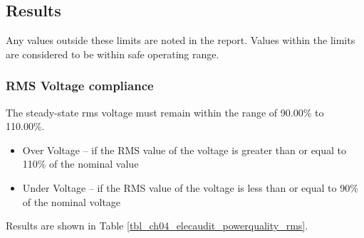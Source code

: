 \subsection{Results}
Any values outside these limits are noted in the report. Values within the limits are considered to be within safe operating range.

\subsubsection{RMS Voltage compliance}

The steady-state rms voltage must remain within the range of 90.00\% to 110.00\%.

\begin{itemize}
\item 	Over Voltage – if the RMS value of the voltage is greater than or equal to 110\% of the nominal value
\item 	Under Voltage – if the RMS value of the voltage is less than or equal to 90\% of the nominal voltage
\end{itemize}

Results are shown in Table \ref{tbl_ch04_elecaudit_powerquality_rms}.


